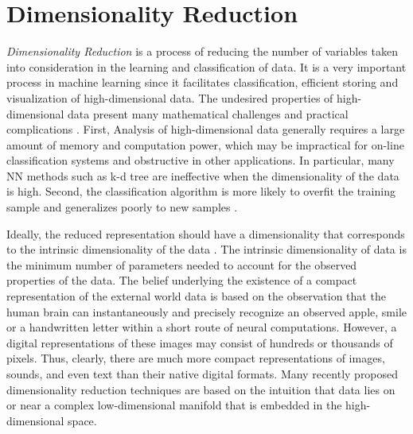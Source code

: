 \newpage{}

\section{Dimensionality Reduction}
\label{sec:dr}

\iftoggle{edit-mode}{\hspace{0pt}\marginpar{What is DR and what techniques are there?}}{}
\emph{Dimensionality Reduction} is a process of reducing the number of variables taken into consideration in the learning and classification of data. 
It is a very important process in machine learning since it facilitates classification, efficient storing and visualization of high-dimensional data. 
The undesired properties of high-dimensional data present many mathematical challenges and practical complications \cite{van2009dimensionality}. 
First, Analysis of high-dimensional data generally requires a large amount of memory and computation power, which may be impractical for on-line classification systems and obstructive in other applications. 
In particular, many NN methods such as k-d tree are ineffective when the dimensionality of the data is high.
Second, the classification algorithm is more likely to overfit the training sample and generalizes poorly to new samples \cite{aida2009word}.

\iftoggle{edit-mode}{\hspace{0pt}\marginpar{data Intrinsic dimensionality}}{}
Ideally, the reduced representation should have a dimensionality that corresponds to the intrinsic dimensionality of the data \cite{van2009dimensionality}.
The intrinsic dimensionality of data is the minimum number of parameters needed to account for the observed properties of the data. 
The belief underlying the existence of a compact representation of the external world data is based on the observation that the human brain can instantaneously and precisely recognize an observed apple, smile or a handwritten letter within a short route of neural computations. 
However, a digital representations of these images may consist of hundreds or thousands of pixels. 
Thus, clearly, there are much more compact representations of images, sounds, and even text than their native digital formats. 
Many recently proposed dimensionality reduction techniques are based on the intuition that data lies on or near a complex low-dimensional manifold that is embedded in the high-dimensional space.

